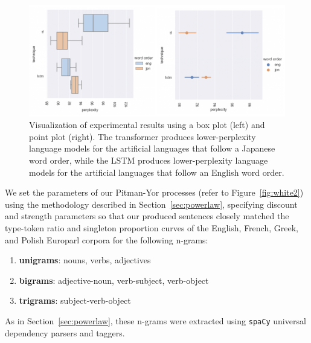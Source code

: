 \documentclass[11pt,a4paper]{article}
\begin{document}
\begin{figure}[t]
\centering
\includegraphics[width=.96\textwidth]{images/results.png}
\caption{Visualization of experimental results using a box plot (left) and point plot (right). The transformer produces lower-perplexity language models for the artificial languages that follow a Japanese word order, while the LSTM produces lower-perplexity language models for the artificial languages that follow an English word order.}
\label{fig:results}
\end{figure}


We set the parameters of our Pitman-Yor processes (refer to Figure~\ref{fig:white2}) using the methodology described in Section~\ref{sec:powerlaw}, specifying discount and strength parameters so that our produced sentences closely matched the type-token ratio and singleton proportion curves of the English, French, Greek, and Polish Europarl corpora for the following n-grams:
\begin{enumerate}
	\item \textbf{unigrams}: nouns, verbs, adjectives
	\item \textbf{bigrams}: adjective-noun, verb-subject, verb-object
	\item \textbf{trigrams}: subject-verb-object 
\end{enumerate}
\noindent As in Section~\ref{sec:powerlaw}, these n-grams were extracted using \texttt{spaCy} universal dependency parsers and taggers.
\end{document}
